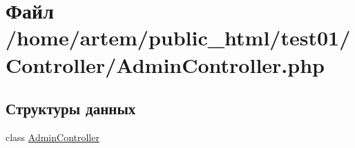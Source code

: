 \hypertarget{_admin_controller_8php}{\section{Файл /home/artem/public\-\_\-html/test01/\-Controller/\-Admin\-Controller.php}
\label{_admin_controller_8php}
}
\subsection*{Структуры данных}
\begin{DoxyCompactItemize}
\item 
class \hyperlink{class_admin_controller}{Admin\-Controller}
\end{DoxyCompactItemize}
